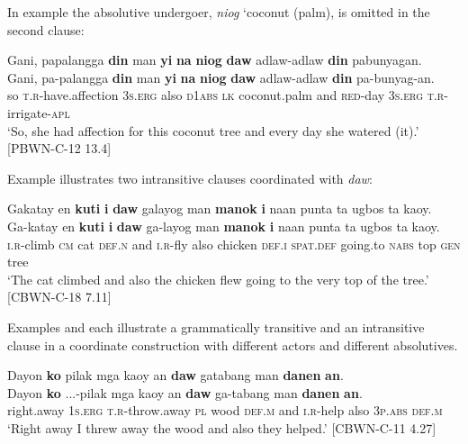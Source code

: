 In example  the absolutive undergoer, \textit{niog} `coconut (palm), is omitted in the second clause:

\ea
\label{ex:shewateredit}
Gani, papalangga \textbf{din} man \textbf{yi} \textbf{na} \textbf{niog} \textbf{daw} adlaw-adlaw \textbf{din} pabunyagan.\\\smallskip
\gll Gani, pa-palangga \textbf{din} man \textbf{yi} \textbf{na} \textbf{niog} \textbf{daw} adlaw-adlaw \textbf{din} pa-bunyag-an. \\
so \textsc{t.r}-have.affection 3\textsc{s.erg} also \textsc{d1abs} \textsc{lk} coconut.palm and \textsc{red}-day 3\textsc{s.erg}   \textsc{t.r}-irrigate-\textsc{apl} \\
\glt ‘So, she had affection for this coconut tree and every day she watered (it).’ [PBWN-C-12 13.4]
\z

Example  illustrates two intransitive clauses coordinated with \textit{daw}:

\ea
\label{ex:topofthetree}
Gakatay en \textbf{kuti} \textbf{i} \textbf{daw} galayog man \textbf{manok} \textbf{i} naan punta ta ugbos ta kaoy.\\\smallskip
\gll Ga-katay en \textbf{kuti} \textbf{i} \textbf{daw} ga-layog man \textbf{manok} \textbf{i} naan punta ta ugbos ta kaoy. \\
\textsc{i.r}-climb \textsc{cm} cat \textsc{def.n} and \textsc{i.r}-fly also chicken \textsc{def.i} \textsc{spat.def} going.to \textsc{nabs} top \textsc{gen} tree \\
\glt ‘The cat climbed and also the chicken flew going to the very top of the tree.’ [CBWN-C-18 7.11]
\z

Examples  and  each illustrate a grammatically transitive and an intransitive clause in a coordinate construction with different actors and different absolutives.

\newpage
\ea
\label{ex:alsotheyhelped}
Dayon \textbf{ko} pilak mga kaoy an \textbf{daw} gatabang man \textbf{danen} \textbf{an}.\\\smallskip
\gll Dayon \textbf{ko} ...-pilak mga kaoy an \textbf{daw} ga-tabang man \textbf{danen} \textbf{an}. \\
right.away 1\textsc{s.erg} \textsc{t.r}-throw.away \textsc{pl} wood \textsc{def.m} and \textsc{i.r}-help also 3\textsc{p.abs} \textsc{def.m} \\
\glt `Right away I threw away the wood and also they helped.’ [CBWN-C-11 4.27]
\z

